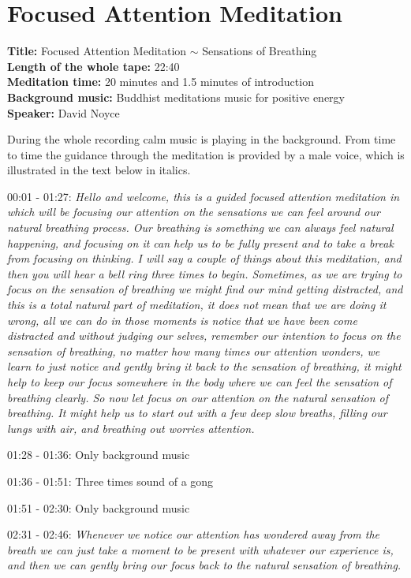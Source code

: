 \chapter{Focused Attention Meditation} \label{FAM}
\textbf{Title:} Focused Attention Meditation $\sim$  Sensations of Breathing  \\
\textbf{Length of the whole tape:} 22:40 \\
\textbf{Meditation time:} 20 minutes and 1.5 minutes of introduction \\
\textbf{Background music:} Buddhist meditations music for positive energy  \\
\textbf{Speaker:} David Noyce 

During the whole recording calm music is playing in the background. From time to time the guidance through the meditation is provided by a male voice, which is illustrated in the text below in italics. 

00:01 - 01:27: \textit{Hello and welcome, this is a guided focused attention meditation in which will be focusing our attention on the sensations we can feel around our natural breathing process. Our breathing is something we can always feel natural happening, and focusing on it can help us to be fully present and to take a break from focusing on thinking. I will say a couple of things about this meditation, and then you will hear a bell ring three times to begin. Sometimes, as we are trying to focus on the sensation of breathing we might find our mind getting distracted, and this is a total natural part of meditation, it does not mean that we are doing it wrong, all we can do in those moments is notice that we have been come distracted and without judging our selves, remember our intention to focus on the sensation of breathing, no matter how many times our attention wonders, we learn to just notice and gently bring it back to the sensation of breathing, it might help to keep our focus somewhere in the body where we can feel the sensation of breathing clearly. So now let focus on our attention on the natural sensation of breathing. It might help us to start out with a few deep slow breaths, filling our lungs with air, and breathing out worries attention.}

01:28 - 01:36: Only background music 

01:36 - 01:51: Three times sound of a gong 

01:51 - 02:30: Only background music

02:31 - 02:46: \textit{Whenever we notice our attention has wondered away from the breath we can just take a moment to be present with whatever our experience is, and then we can gently bring our focus back to the natural sensation of breathing. }


